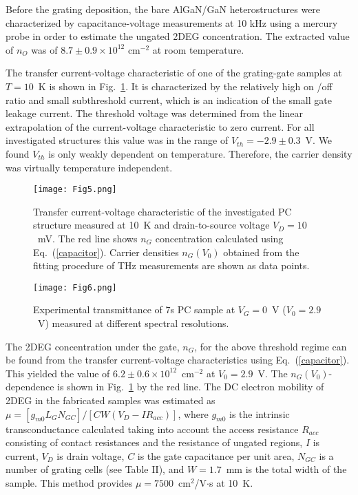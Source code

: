 \documentclass[%
 reprint,
 amsmath,amssymb,
 aps,
]{revtex4-2}
\begin{document}
Before the grating deposition, the bare AlGaN/GaN heterostructures were characterized by capacitance-voltage measurements at 10 kHz using a mercury probe in order to estimate the ungated 2DEG concentration. The extracted value of $n_{O}$ was of $8.7 \pm 0.9 \times 10^{12}$ cm$^{-2}$ at room temperature.

The transfer current-voltage characteristic of one of the grating-gate samples at $T = 10$~K is shown in Fig.~\ref{Fig5}. It is characterized by the relatively high on \slash off ratio and small subthreshold current, which is an indication of the small gate leakage current. The threshold voltage was determined from the linear extrapolation of the current-voltage characteristic to zero current. For all investigated structures this value was in the range of $V_{th} = -2.9 \pm 0.3$~V. We found $V_{th}$ is only weakly dependent on temperature. Therefore, the carrier density was virtually temperature independent.

\begin{figure}[t!]
\texttt{[image: Fig5.png]}
\caption{\label{Fig5} Transfer current-voltage characteristic of the investigated PC structure measured at 10~K and drain-to-source voltage $V_D = 10$~mV. The red line shows $n_G$ concentration calculated using Eq.~(\ref{capacitor}). Carrier densities $n_G(V_0)$ obtained from the fitting procedure of THz measurements are shown as data points.}
\end{figure}

\begin{figure}[b!]
\texttt{[image: Fig6.png]}
\caption{\label{Fig6} Experimental transmittance of 7s PC sample at $V_G = 0$~V ($V_0 = 2.9$~V) measured at different spectral resolutions.}
\end{figure}

The 2DEG concentration under the gate, $n_{G}$, for the above threshold regime can be found from the transfer current-voltage characteristics using Eq.~(\ref{capacitor}). This yielded the value of $6.2 \pm 0.6 \times 10^{12}$~cm$^{-2}$ at $V_0 = 2.9$~V. The $n_{G}(V_0)$-dependence is shown in Fig.~\ref{Fig5} by the red line. The DC electron mobility of 2DEG in the fabricated samples was estimated as $\mu = [g_{m0} L_G N_{GC}] / [C W (V_D - I R_{acc})]$, where $g_{m0}$ is the intrinsic transconductance calculated taking into account the access resistance $R_{acc}$ consisting of contact resistances and the resistance of ungated regions, $I$ is current, $V_D$ is drain voltage, $C$ is the gate capacitance per unit area, $N_{GC}$ is a number of grating cells (see Table II), and $W = 1.7$~mm is the total width of the sample. This method provides  $\mu = 7500$~cm$^{2}$/V$\cdot$s at 10~K.
\end{document}
